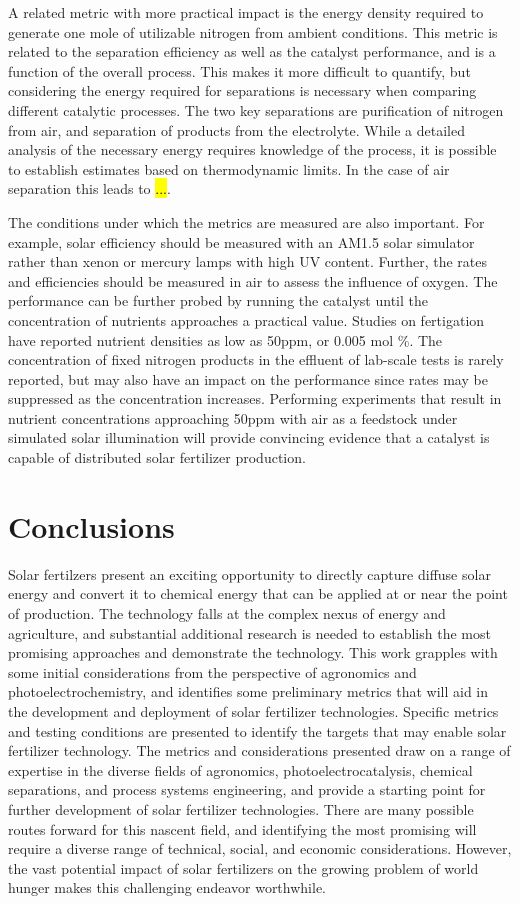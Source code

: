 A related metric with more practical impact is the energy density required to generate one mole of utilizable nitrogen from ambient conditions. This metric is related to the separation efficiency as well as the catalyst performance, and is a function of the overall process. This makes it more difficult to quantify, but considering the energy required for separations is necessary when comparing different catalytic processes. The two key separations are purification of nitrogen from air, and separation of products from the electrolyte. While a detailed analysis of the necessary energy requires knowledge of the process, it is possible to establish estimates based on thermodynamic limits. In the case of air separation this leads to \hl{...}. 

The conditions under which the metrics are measured are also important. For example, solar efficiency should be measured with an AM1.5 solar simulator rather than xenon or mercury lamps with high UV content. Further, the rates and efficiencies should be measured in air to assess the influence of oxygen. The performance can be further probed by running the catalyst until the concentration of nutrients approaches a practical value. Studies on fertigation have reported nutrient densities as low as 50ppm, or 0.005 mol \%. The concentration of fixed nitrogen products in the effluent of lab-scale tests is rarely reported, but may also have an impact on the performance since rates may be suppressed as the concentration increases. Performing experiments that result in nutrient concentrations approaching 50ppm with air as a feedstock under simulated solar illumination will provide convincing evidence that a catalyst is capable of distributed solar fertilizer production.

\section{Conclusions}

Solar fertilzers present an exciting opportunity to directly capture diffuse solar energy and convert it to chemical energy that can be applied at or near the point of production. The technology falls at the complex nexus of energy and agriculture, and substantial additional research is needed to establish the most promising approaches and demonstrate the technology. This work grapples with some initial considerations from the perspective of agronomics and photoelectrochemistry, and identifies some preliminary metrics that will aid in the development and deployment of solar fertilizer technologies. Specific metrics and testing conditions are presented to identify the targets that may enable solar fertilizer technology. The metrics and considerations presented draw on a range of expertise in the diverse fields of agronomics, photoelectrocatalysis, chemical separations, and process systems engineering, and provide a starting point for further development of solar fertilizer technologies. There are many possible routes forward for this nascent field, and identifying the most promising will require a diverse range of technical, social, and economic considerations. However, the vast potential impact of solar fertilizers on the growing problem of world hunger makes this challenging endeavor worthwhile.


